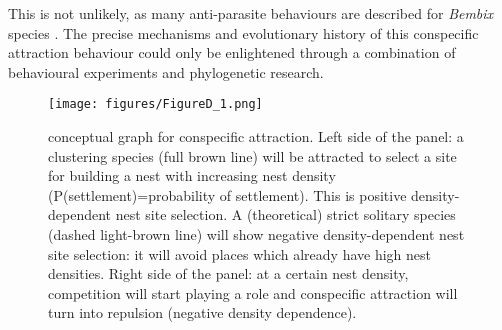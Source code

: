 \documentclass[10pt, twoside]{book} %
\begin{document}
This is not unlikely, as many anti-parasite behaviours are described for \textit{Bembix} species \citep{nielsen1945, evans1966, evans2007, polidori2009a}. The precise mechanisms and evolutionary history of this conspecific attraction behaviour could only be enlightened through a combination of behavioural experiments and phylogenetic research.\\
	
	
	\begin{figure}[h!]
		\begin{center}
			\texttt{[image: figures/FigureD\_1.png]}
		\end{center}
		\begin{footnotesize}
			\vspace*{-4mm}
			\caption{conceptual graph for conspecific attraction. Left side of the panel: a clustering species (full brown line) will be attracted to select a site for building a nest with increasing nest density (P(settlement)=probability of settlement). This is positive density-dependent nest site selection. A (theoretical) strict solitary species (dashed light-brown line) will show negative density-dependent nest site selection: it will avoid places which already have high nest densities. Right side of the panel: at a certain nest density, competition will start playing a role and conspecific attraction will turn into repulsion (negative density dependence). \label{figD.1}}
		\end{footnotesize}
	\end{figure}
	
\end{document}
